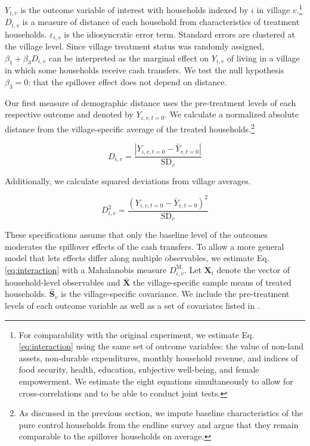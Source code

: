 \documentclass[11pt]{article}
\begin{document}
        $Y_{i,v}$ is the outcome variable of interest with households indexed by $i$ in village $v$.\footnote{For comparability with the original experiment, we estimate Eq. \ref{eq:interaction} using the same set of outcome variables: the value of non-land assets, non-durable expenditures, monthly household revenue, and indices of food security, health, education, subjective well-being, and female empowerment. We estimate the eight equations simultaneously to allow for cross-correlations and to be able to conduct joint tests.} $D_{i,v}$ is a measure of distance of each household from characteristics of treatment households. $\varepsilon_{i,v}$ is the idiosyncratic error term. Standard errors are clustered at the village level. Since village treatment status was randomly assigned, $\beta_1 + \beta_3 D_{i,v}$ can be interpreted as the marginal effect on $Y_{i,v}$ of living in a village in which some households receive cash transfers. We test the null hypothesis $\beta_3 = 0$: that the spillover effect does not depend on distance.

        Our first measure of demographic distance uses the pre-treatment levels of each respective outcome and denoted by $Y_{i,v,t=0}$. We calculate a normalized absolute distance from the village-specific average of the treated households.\footnote{As discussed in the previous section, we impute baseline characteristics of the pure control households from the endline survey and argue that they remain comparable to the spillover households on average.}

            \begin{equation} \label{eq:absdev}
            D_{i,v} = \frac{|Y_{i,v,t=0} - \bar Y_{v,t=0}|}{\text{SD}_v}
            \end{equation}

        Additionally, we calculate squared deviations from village averages.

            \begin{equation} \label{eq:sqdev}
            D^2_{i,v} = \frac{(Y_{i,v,t=0} - \bar Y_{v,t=0})^2}{\text{SD}_v}
            \end{equation}

        These specifications assume that only the baseline level of the outcomes moderates the spillover effects of the cash transfers. To allow a more general model that lets effects differ along multiple observables, we estimate Eq. \ref{eq:interaction} with a Mahalanobis measure $D^\text{M.}_{i,v}$. Let $\mathbf X_i$ denote the vector of household-level observables and $\mathbf{\bar X}$ the village-specific sample means of treated households. $\mathbf{\hat S}_v$ is the village-specific covariance. We include the pre-treatment levels of each outcome variable as well as a set of covariates listed in \textcite{haushofer_short-term_2016}.
\end{document}

